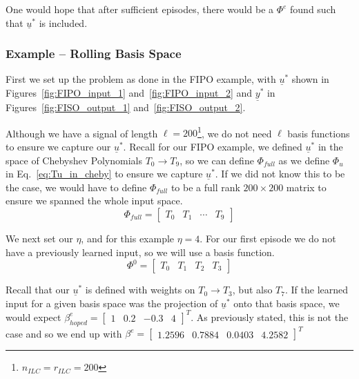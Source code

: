 One would hope that after sufficient episodes, there would be a $\Phi^e$ found such that $\underline{u}^\ast$ is included.

\FloatBarrier\subsubsection{Example -- Rolling Basis Space}
First we set up the problem as done in the FIPO example, with $\underline{u}^\ast$ shown in Figures~\ref{fig:FIPO_input_1} and~\ref{fig:FIPO_input_2} and $\underline{y}^\ast$ in Figures~\ref{fig:FISO_output_1} and~\ref{fig:FISO_output_2}.

Although we have a signal of length $\ell = 200$\footnote{$n_{ILC} = r_{ILC} = 200$}, we do not need $\ell$ basis functions to ensure we capture our $\underline{u}^\ast$. Recall for our FIPO example, we defined $\underline{u}^\ast$ in the space of Chebyshev Polynomials $T_0 \to T_9$, so we can define $\Phi_{full}$ as we define $\Phi_u$ in Eq.~\ref{eq:Tu_in_cheby} to ensure we capture $\underline{u}^\ast$. If we did not know this to be the case, we would have to define $\Phi_{full}$ to be a full rank $200 \times 200$ matrix to ensure we spanned the whole input space.
\begin{equation}
    \Phi_{full} =
    \begin{bmatrix}
        T_0 & T_1 & \cdots & T_9
    \end{bmatrix}
\end{equation}

We next set our $\eta$, and for this example $\eta = 4$. For our first episode we do not have a previously learned input, so we will use a basis function. 
\begin{equation}
    \Phi^0 =
    \begin{bmatrix}
        T_0 & T_1 & T_2 & T_3
    \end{bmatrix}
\end{equation}

Recall that our $\underline{u}^\ast$ is defined with weights on $T_0 \to T_3$, but also $T_7$. If the learned input for a given basis space was the projection of $\underline{u}^\ast$ onto that basis space, we would expect $\beta_{hoped}^e = {\begin{bmatrix}1 & 0.2 & -0.3 & 4\end{bmatrix}}^T$. As previously stated, this is not the case and so we end up with $\beta^e = {\begin{bmatrix}1.2596  &  0.7884  &  0.0403  &  4.2582\end{bmatrix}}^T$

